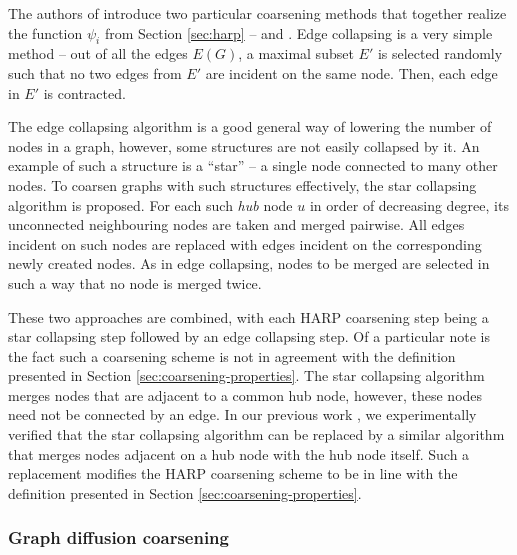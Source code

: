 The authors of \cite{chen_harp_2018} introduce two particular coarsening methods that together realize the function \( \psi_i \) from Section \ref{sec:harp} --  and . Edge collapsing is a very simple method -- out of all the edges \( E \left( G \right) \), a maximal subset \( E' \) is selected randomly such that no two edges from \( E' \) are incident on the same node. Then, each edge in \( E' \) is contracted.

The edge collapsing algorithm is a good general way of lowering the number of nodes in a graph, however, some structures are not easily collapsed by it. An example of such a structure is a \enquote{star} -- a single node connected to many other nodes. To coarsen graphs with such structures effectively, the star collapsing algorithm is proposed. For each such \textit{hub} node \( u \) in order of decreasing degree, its unconnected neighbouring nodes are taken and merged pairwise. All edges incident on such nodes are replaced with edges incident on the corresponding newly created nodes. As in edge collapsing, nodes to be merged are selected in such a way that no node is merged twice.

These two approaches are combined, with each HARP coarsening step being a star collapsing step followed by an edge collapsing step. Of a particular note is the fact such a coarsening scheme is not in agreement with the definition presented in Section \ref{sec:coarsening-properties}. The star collapsing algorithm merges nodes that are adjacent to a common hub node, however, these nodes need not be connected by an edge. In our previous work \cite{dedic_graph_2021}, we experimentally verified that the star collapsing algorithm can be replaced by a similar algorithm that merges nodes adjacent on a hub node with the hub node itself. Such a replacement modifies the HARP coarsening scheme to be in line with the definition presented in Section \ref{sec:coarsening-properties}.

\subsubsection{Graph diffusion coarsening}\label{sec:gdc-coarsening}

